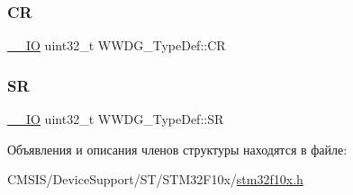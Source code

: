 \mbox{\label{struct_w_w_d_g___type_def_a4caf530d45f7428c9700d9c0057135f8}} 
\subsubsection{\texorpdfstring{CR}{CR}}
{\footnotesize\ttfamily \mbox{\hyperlink{group___c_m_s_i_s___c_m3__core__definitions_gaec43007d9998a0a0e01faede4133d6be}{\+\_\+\+\_\+\+IO}} uint32\+\_\+t W\+W\+D\+G\+\_\+\+Type\+Def\+::\+CR}

\mbox{\label{struct_w_w_d_g___type_def_a15655cda4854cc794db1f27b3c0bba38}} 
\subsubsection{\texorpdfstring{SR}{SR}}
{\footnotesize\ttfamily \mbox{\hyperlink{group___c_m_s_i_s___c_m3__core__definitions_gaec43007d9998a0a0e01faede4133d6be}{\+\_\+\+\_\+\+IO}} uint32\+\_\+t W\+W\+D\+G\+\_\+\+Type\+Def\+::\+SR}



Объявления и описания членов структуры находятся в файле\+:\begin{DoxyCompactItemize}
\item 
C\+M\+S\+I\+S/\+Device\+Support/\+S\+T/\+S\+T\+M32\+F10x/\mbox{\hyperlink{stm32f10x_8h}{stm32f10x.\+h}}\end{DoxyCompactItemize}
